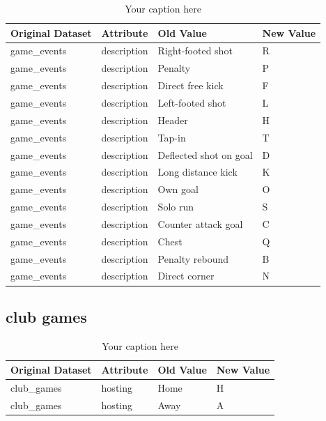 \documentclass{Configuration_Files/PoliMi3i_thesis}
\begin{document}
\begin{table}[ht]
	\centering
	\begin{tabular}{|l|l|l|l|}
		\hline
		\textbf{Original Dataset} & \textbf{Attribute} & \textbf{Old Value}     & \textbf{New Value} \\ \hline
		game\_events              & description        & Right-footed shot      & R                  \\ \hline
		game\_events              & description        & Penalty                & P                  \\ \hline
		game\_events              & description        & Direct free kick       & F                  \\ \hline
		game\_events              & description        & Left-footed shot       & L                  \\ \hline
		game\_events              & description        & Header                 & H                  \\ \hline
		game\_events              & description        & Tap-in                 & T                  \\ \hline
		game\_events              & description        & Deflected shot on goal & D                  \\ \hline
		game\_events              & description        & Long distance kick     & K                  \\ \hline
		game\_events              & description        & Own goal               & O                  \\ \hline
		game\_events              & description        & Solo run               & S                  \\ \hline
		game\_events              & description        & Counter attack goal    & C                  \\ \hline
		game\_events              & description        & Chest                  & Q                  \\ \hline
		game\_events              & description        & Penalty rebound        & B                  \\ \hline
		game\_events              & description        & Direct corner          & N                  \\ \hline
	\end{tabular}
	\caption{Your caption here}
	\label{your-label-here}
\end{table}
\subsection{club games}
\begin{table}[ht]
	\centering
	\begin{tabular}{|l|l|l|l|}
		\hline
		\textbf{Original Dataset} & \textbf{Attribute} & \textbf{Old Value} & \textbf{New Value} \\ \hline
		club\_games               & hosting            & Home               & H                  \\ \hline
		club\_games               & hosting            & Away               & A                  \\ \hline
	\end{tabular}
	\caption{Your caption here}
	\label{your-label-here}
\end{table}
\end{document}

